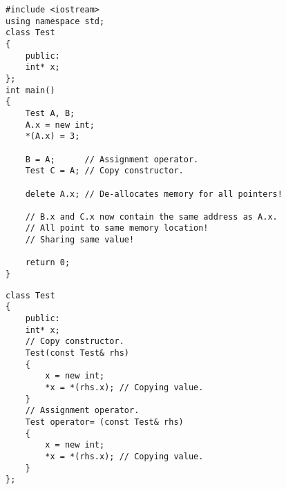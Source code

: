 \documentclass[12pt,a4paper]{article}
\begin{document}
\begin{minipage}{8cm}
\begin{lstlisting}[caption={Default cbject copy with pointers}]
#include <iostream>
using namespace std;
class Test
{
	public:
	int* x;
};
int main()
{
	Test A, B;
	A.x = new int;
	*(A.x) = 3;
	
	B = A;		// Assignment operator.
	Test C = A; // Copy constructor.
	
	delete A.x; // De-allocates memory for all pointers!

	// B.x and C.x now contain the same address as A.x.
	// All point to same memory location!
	// Sharing same value!
	
	return 0;
}
\end{lstlisting}
\end{minipage}
\begin{lstlisting}[caption={Overloading copy constructor and assignment operator}]
class Test
{
	public:
	int* x;
	// Copy constructor.
	Test(const Test& rhs)
	{
		x = new int;
		*x = *(rhs.x); // Copying value.
	}
	// Assignment operator.
	Test operator= (const Test& rhs)
	{
		x = new int;
		*x = *(rhs.x); // Copying value.
	}
};
\end{lstlisting}


\end{document}
